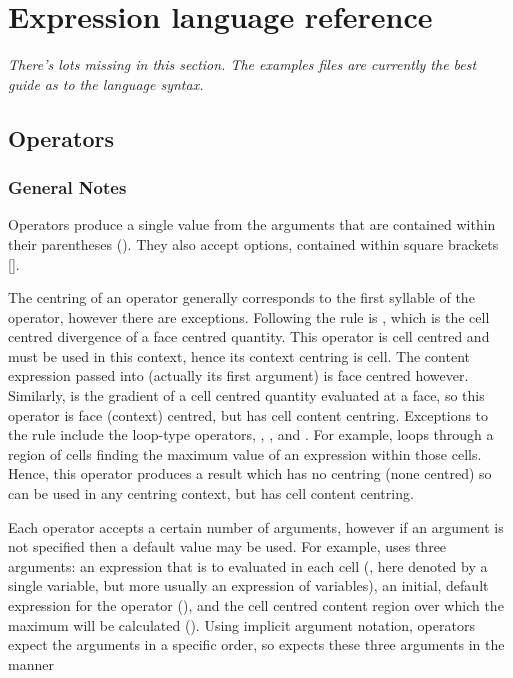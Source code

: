 
\pagebreak
\section{Expression language reference \label{sec:language}}

\emph{There's lots missing in this section.  The examples files are currently the best guide as to the language syntax.}

\subsection{Operators}

\subsubsection{General Notes}

Operators produce a single value from the arguments that are contained within their parentheses ().  They also accept options, contained within square brackets [].


The centring of an operator generally corresponds to the first syllable of the operator, however there are exceptions.   Following the rule is , which is the cell centred divergence of a face centred quantity.  This operator is cell centred and must be used in this context, hence its context centring is cell.  The content expression passed into  (actually its first argument) is face centred however.  Similarly,  is the gradient of a cell centred quantity evaluated at a face, so this operator is face (context) centred, but has cell content centring.  Exceptions to the rule include the loop-type operators, , ,  and .  For example,  loops through a region of cells finding the maximum value of an expression within those cells.  Hence, this operator produces a result which has no centring (none centred) so can be used in any centring context, but has cell content centring.  

Each operator accepts a certain number of arguments, however if an argument is not specified then a default value may be used.  For example,  uses three arguments:  an expression that is to evaluated in each cell (, here denoted by a single variable, but more usually an expression of variables), an initial, default expression for the operator (), and the cell centred content region over which the maximum will be calculated ().  Using implicit argument notation, operators expect the arguments in a specific order, so  expects these three arguments in the manner
 
